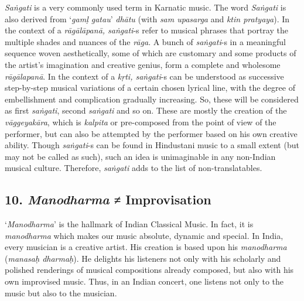 \textit{Saṅgati} is a very commonly used term in Karnatic music. The word \textit{Saṅgati} is also derived from ‘\textit{gamḷ gatau}’ \textit{dhātu} (with \textit{sam upasarga} and \textit{ktin pratyaya}). In the context of a \textit{rāgālāpanā, saṅgati}-s refer to musical phrases that portray the multiple shades and nuances of the \textit{rāga}. A bunch of \textit{saṅgati}-s in a meaningful sequence woven aesthetically, some of which are customary and some products of the artist’s imagination and creative genius, form a complete and wholesome \textit{rāgālapanā}. In the context of a \textit{kṛti, saṅgati}-s can be understood as successive step-by-step musical variations of a certain chosen lyrical line, with the degree of embellishment and complication gradually increasing. So, these will be considered as first \textit{saṅgati}, second \textit{saṅgati} and so on. These are mostly the creation of the \textit{vāggeyakāra}, which is \textit{kalpita} or pre-composed from the point of view of the performer, but can also be attempted by the performer based on his own creative ability. Though \textit{saṅgati}-s can be found in Hindustani music to a small extent (but may not be called as such), such an idea is unimaginable in any non-Indian musical culture. Therefore, \textit{saṅgati} adds to the list of non-translatables.


\subsection*{10. \textit{Manodharma} ≠ Improvisation}

‘\textit{Manodharma}’ is the hallmark of Indian Classical Music. In fact, it is \textit{manodharma} which makes our music absolute, dynamic and special. In India, every musician is a creative artist. His creation is based upon his \textit{manodharma} (\textit{manasaḥ dharmaḥ}). He delights his listeners not only with his scholarly and polished renderings of musical compositions already composed, but also with his own improvised music. Thus, in an Indian concert, one listens not only to the music but also to the musician.

\newpage

